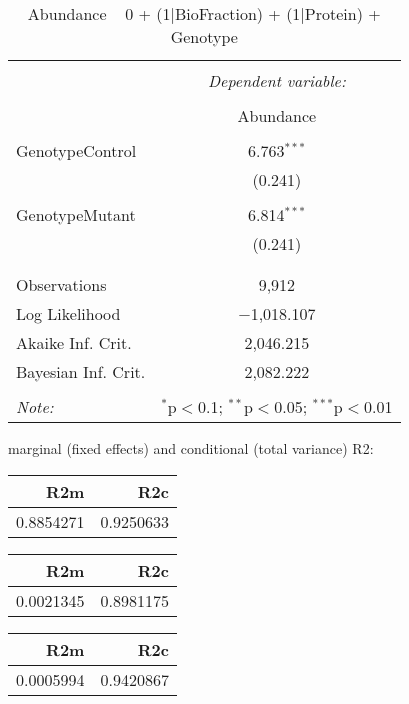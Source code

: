 \documentclass[11pt]{report}
\begin{document}
\begin{table}[!htbp] \centering 
  \caption{Abundance ~ 0 + (1|BioFraction) + (1|Protein) + Genotype} 
  \label{} 
\begin{tabular}{@{\extracolsep{5pt}}lc} 
\\[-1.8ex]\hline 
\hline \\[-1.8ex] 
 & \multicolumn{1}{c}{\textit{Dependent variable:}} \\ 
\cline{2-2} 
\\[-1.8ex] & Abundance \\ 
\hline \\[-1.8ex] 
 GenotypeControl & 6.763$^{***}$ \\ 
  & (0.241) \\ 
  & \\ 
 GenotypeMutant & 6.814$^{***}$ \\ 
  & (0.241) \\ 
  & \\ 
\hline \\[-1.8ex] 
Observations & 9,912 \\ 
Log Likelihood & $-$1,018.107 \\ 
Akaike Inf. Crit. & 2,046.215 \\ 
Bayesian Inf. Crit. & 2,082.222 \\ 
\hline 
\hline \\[-1.8ex] 
\textit{Note:}  & \multicolumn{1}{r}{$^{*}$p$<$0.1; $^{**}$p$<$0.05; $^{***}$p$<$0.01} \\ 
\end{tabular} 
\end{table} 
marginal (fixed effects) and conditional (total variance) R2:

\begin{tabular}{r|r}
\hline
R2m & R2c\\
\hline
0.8854271 & 0.9250633\\
\hline
\end{tabular}

\begin{tabular}{r|r}
\hline
R2m & R2c\\
\hline
0.0021345 & 0.8981175\\
\hline
\end{tabular}

\begin{tabular}{r|r}
\hline
R2m & R2c\\
\hline
0.0005994 & 0.9420867\\
\hline
\end{tabular}
\end{document}
